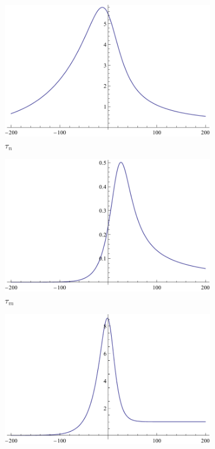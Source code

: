 \documentclass{article}
\numberwithin{equation}{section}
\begin{document}
    \begin{figure}[H]
        \centering
        \begin{subfigure}[t]{0.3\textwidth}
            \includegraphics[width=\textwidth]{./schemas/tn.pdf}
            \caption{$\tau_n$}
        \end{subfigure}
        \begin{subfigure}[t]{0.3\textwidth}
            \includegraphics[width=\textwidth]{./schemas/tm.pdf}
            \caption{$\tau_m$}
        \end{subfigure}
        \begin{subfigure}[t]{0.3\textwidth}
            \includegraphics[width=\textwidth]{./schemas/th.pdf}

\end{subfigure}
\end{figure}
\end{document}
